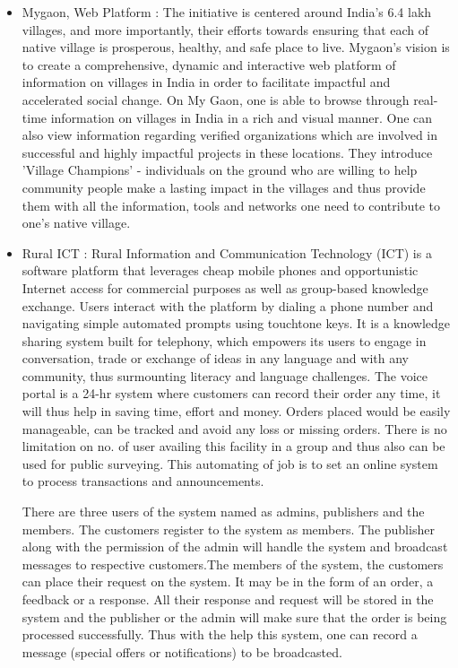 \begin{itemize}
\item Mygaon, Web Platform \cite{MyGao25:online} : The initiative is centered around India's 6.4 lakh villages, and more importantly, their efforts towards ensuring that each of native village is prosperous, healthy, and safe place to live. Mygaon's vision is to create a comprehensive, dynamic and interactive web platform of information on villages in India in order to facilitate impactful and accelerated social change. On My Gaon, one is able to browse through real-time information on villages in India in a rich and visual manner. One can also view information regarding verified organizations which are involved in successful and highly impactful projects in these locations. They introduce 'Village Champions' - individuals on the ground who are willing to help community people make a lasting impact in the villages and thus provide them with all the information, tools and networks one need to contribute to one's native village.

\item Rural ICT \cite{home21:online} : Rural Information and Communication Technology (ICT) is a software platform that leverages cheap mobile phones and opportunistic Internet access for commercial purposes as well as group-based knowledge exchange. Users interact with the platform by dialing a phone number and navigating simple automated prompts using touchtone keys. It is a knowledge sharing system built for telephony, which empowers its users to engage in conversation, trade or exchange of ideas in any language and with any community, thus surmounting literacy and language challenges. The voice portal is a 24-hr system where customers can record their order any time, it will thus help in saving time, effort and money. Orders placed would be easily manageable, can be tracked and avoid any loss or missing orders. There is no limitation on no. of user availing this facility in a group and thus also can be used for public surveying. This automating of job is to set an online system to process transactions and announcements.

There are three users of the system named as admins, publishers and the members. The customers register to the system as members. The publisher along with the permission of the admin will handle the system and broadcast messages to respective customers.The members of the system, the customers can place their request on the system. It may be in the form of an order, a feedback or a response. All their response and request will be stored in the system and the publisher or the admin will make sure that the order is being processed successfully. Thus with the help this system, one can record a message (special offers or notifications) to be broadcasted.


\end{itemize}
